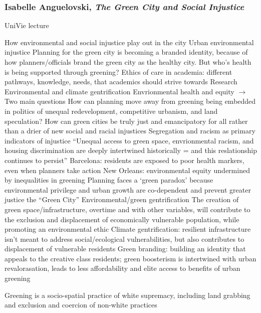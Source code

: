 \documentclass{article}
\newcommand{\alignedmarginpar}[1]{%
        \marginpar{\raggedright\small #1}
    }
\begin{document}
\subsubsection{Isabelle Anguelovski, \textit{The Green City and Social Injustice}}

UniVie lecture

\begin{outline}
	\1 How environmental and social injustice play out in the city
	\1 Urban environmental injustice
	\1 Planning for the green city is becoming a branded identity, because of how planners/officials brand the green city as the healthy city. But who's health is being supported through greening?
	\1 Ethics of care in academia: different pathways, knowledge, needs, that academics should strive towards
	\1 Research  
		\2 Environmental and climate gentrification
		\2 Envrionmental health and equity
	 	\2 $\rightarrow$ Two main questions	
			\3 How can planning move away from greening being embedded in politics of unequal redevelopment, competitive urbanism, and land speculation?
			\3 How can green cities be truly just and emancipatory for all rather than a drier of new social and racial injustices
	\1 Segregation and racism as primary indicators of injustice 
		\2 ``Unequal access to green space, envrionmental racism, and housing discrimination are deeply intertwined historically = and this reslationship continues to persist''
		\2 Barcelona: residents are exposed to poor health markers, even when planners take action
		\2 New Orleans: environmental equity undermined by inequalities in greening
	\1 Planning faces a `green paradox' because environmental privilege and urban growth are co-dependent and prevent greater justice the ``Green City''
	\1 Environmental/green gentrification
		\2 The creation of green space/infrastructure, overtime and with other variables, will contribute to the exclusion and displacement of economically vulnerable population, while promoting an environmental ethic
		\2 Climate gentrification: resilient infrastructure isn't meant to address social/ecological vulnerabilities, but also contributes to displacement of vulnerable residents
	\1 Green branding: building an identity that appeals to the creative class residents; green boosterism is intertwined with urban revalorasation, leads to less affordability and elite access to benefits of urban greening\alignedmarginpar{Exclusive spaces}
	\1 Greening is a socio-spatial practice of white supremacy, including land grabbing and exclusion and coercion of non-white practices\alignedmarginpar{Non diverse uses}

\end{outline}
\end{document}
